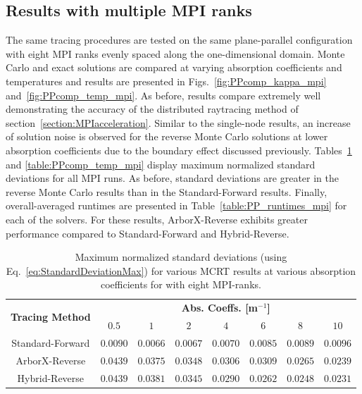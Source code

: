 \subsection{Results with multiple MPI ranks}
The same tracing procedures are tested on the same plane-parallel configuration with eight MPI ranks evenly spaced along the one-dimensional domain.
Monte Carlo and exact solutions are compared at varying absorption coefficients and temperatures and results are presented in Figs.~\ref{fig:PPcomp_kappa_mpi} and~\ref{fig:PPcomp_temp_mpi}. As before, results compare extremely well demonstrating the accuracy of the distributed raytracing method of section~\ref{section:MPIacceleration}. Similar to the single-node results, an increase of solution noise is observed for the reverse Monte Carlo solutions at lower absorption coefficients due to the boundary effect discussed previously. Tables~\ref{table:PPcomp_std_mpi} and \ref{table:PPcomp_temp_mpi} display maximum normalized standard deviations for all MPI runs. As before, standard deviations are greater in the reverse Monte Carlo results than in the Standard-Forward results. Finally, overall-averaged runtimes are presented in Table~\ref{table:PP_runtimes_mpi} for each of the solvers. For these results, ArborX-Reverse exhibits greater performance compared to Standard-Forward and Hybrid-Reverse. 



\begin{table}
\centering
\caption{Maximum normalized standard deviations (using Eq.~\ref{eq:StandardDeviationMax}) for various MCRT results at various absorption coefficients for with eight MPI-ranks.}
\begin{tabular}{c c c c c c c c} 
\hline
\multirow{ 2}{*}{\bfseries Tracing Method} & 
\multicolumn{7}{c}{\bfseries Abs. Coeffs. [m$^{-1}$]} \\ [0.5ex] \cline{2-8}
 & $0.5$ & $1$ & $2$ & $4$ & $6$ & $8$ & $10$\\ [0.5ex]
 \hline
 Standard-Forward & $0.0090$ & $0.0066$ & $0.0067$ & $0.0070$ & $0.0085$ & $0.0089$ & $0.0096$\\ [0.5ex] 
 ArborX-Reverse & $0.0439$ & $0.0375$ & $0.0348$ & $0.0306$ & $0.0309$ & $0.0265$ & $0.0239$\\ [0.5ex] 
 Hybrid-Reverse & $0.0439$ & $0.0381$ & $0.0345$ & $0.0290$ & $0.0262$ & $0.0248$ & $0.0231$\\ [0.5ex] 
 \hline
\end{tabular}
\label{table:PPcomp_std_mpi}
\end{table}



